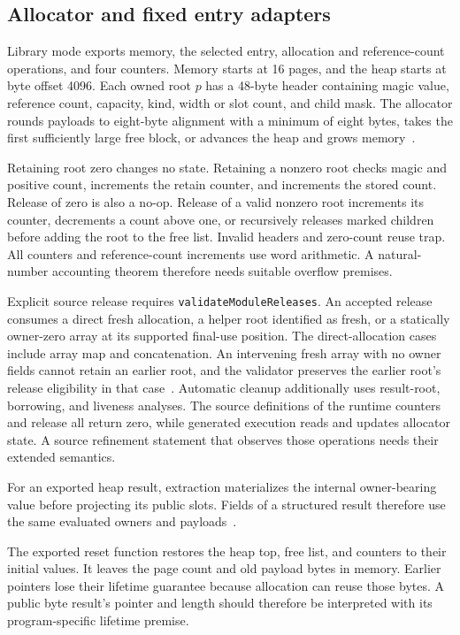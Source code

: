 \documentclass[11pt]{article}
\newcommand{\code}[1]{\texttt{#1}}
\begin{document}
\subsection{Allocator and fixed entry adapters}
\label{sec:allocator}

Library mode exports memory, the selected entry, allocation and reference-count operations, and four counters.  Memory starts at 16 pages, and the heap starts at byte offset 4096.  Each owned root $p$ has a 48-byte header containing magic value, reference count, capacity, kind, width or slot count, and child mask.  The allocator rounds payloads to eight-byte alignment with a minimum of eight bytes, takes the first sufficiently large free block, or advances the heap and grows memory~\cite{binary}.

Retaining root zero changes no state.  Retaining a nonzero root checks magic and positive count, increments the retain counter, and increments the stored count.  Release of zero is also a no-op.  Release of a valid nonzero root increments its counter, decrements a count above one, or recursively releases marked children before adding the root to the free list.  Invalid headers and zero-count reuse trap.  All counters and reference-count increments use word arithmetic.  A natural-number accounting theorem therefore needs suitable overflow premises.

Explicit source release requires \code{validateModuleReleases}.  An accepted release consumes a direct fresh allocation, a helper root identified as fresh, or a statically owner-zero array at its supported final-use position.  The direct-allocation cases include array map and concatenation.  An intervening fresh array with no owner fields cannot retain an earlier root, and the validator preserves the earlier root's release eligibility in that case~\cite{release}.  Automatic cleanup additionally uses result-root, borrowing, and liveness analyses.  The source definitions of the runtime counters and release all return zero, while generated execution reads and updates allocator state.  A source refinement statement that observes those operations needs their extended semantics.

For an exported heap result, extraction materializes the internal owner-bearing value before projecting its public slots.  Fields of a structured result therefore use the same evaluated owners and payloads~\cite{extract}.

The exported reset function restores the heap top, free list, and counters to their initial values.  It leaves the page count and old payload bytes in memory.  Earlier pointers lose their lifetime guarantee because allocation can reuse those bytes.  A public byte result's pointer and length should therefore be interpreted with its program-specific lifetime premise.
\end{document}
